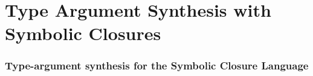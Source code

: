 
\chapter{Type Argument Synthesis with Symbolic Closures}
\label{chapter:symbolic:directed-lti}

\subsection{Type-argument synthesis for the Symbolic Closure Language}

